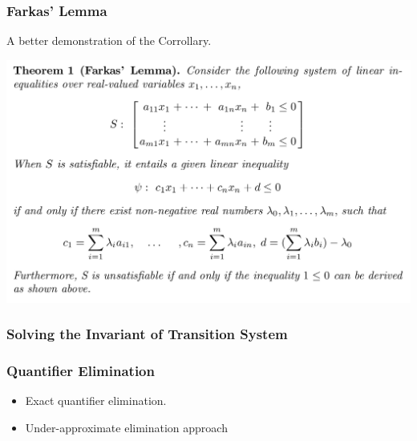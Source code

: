 \documentclass[11pt]{beamer}
\begin{document}
\begin{frame}\frametitle{Farkas' Lemma}
A better demonstration of the Corrollary.
\begin{center}
\includegraphics[scale=0.25]{fc.png}
\end{center}

\end{frame}

\begin{frame}\frametitle{Solving the Invariant of Transition System}

\end{frame}

\begin{frame}\frametitle{Quantifier Elimination}
\begin{itemize}
\item Exact quantifier elimination.

\item Under-approximate elimination approach
\end{itemize}
\end{frame}
\end{document}
